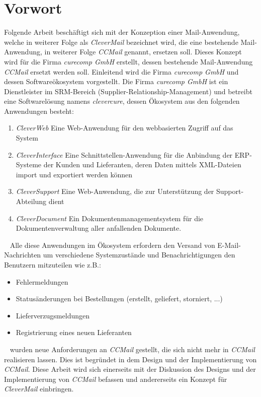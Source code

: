 \chapter{Vorwort} 	%
\label{cha:vorwort}
Folgende Arbeit beschäftigt sich mit der Konzeption einer Mail-Anwendung, welche in weiterer Folge als \emph{CleverMail} bezeichnet wird, die eine bestehende Mail-Anwendung, in weiterer Folge \emph{CCMail} genannt, ersetzen soll. Dieses Konzept wird für die Firma \emph{curecomp GmbH} erstellt, dessen bestehende Mail-Anwendung \emph{CCMail} ersetzt werden soll. Einleitend wird die Firma \emph{curecomp GmbH} und dessen Softwareökosystem vorgestellt. 
\newline
\newline
Die Firma \emph{curecomp GmbH} ist ein Dienstleister im SRM-Bereich (Supplier-Relationship-Management) und betreibt eine Softwarelösung namens \emph{clevercure}, dessen Ökosystem aus den folgenden Anwendungen besteht:
\newline
\begin{enumerate}
	\item\emph{CleverWeb}
	\newline
	Eine Web-Anwendung für den webbasierten Zugriff auf das System
	\item\emph{CleverInterface}
	\newline
	Eine Schnittstellen-Anwendung für die Anbindung der ERP-Systeme der Kunden und Lieferanten, deren Daten mittels XML-Dateien
	\newline
	import und exportiert werden können
	\item\emph{CleverSupport}
	\newline
	Eine Web-Anwendung, die zur Unterstützung der Support-Abteilung dient
	\item\emph{CleverDocument}
	\newline
	Ein Dokumentenmanagementsystem für die Dokumentenverwaltung aller anfallenden Dokumente.
\end{enumerate} 
\ \newline
Alle diese Anwendungen im Ökosystem erfordern den Versand von E-Mail-Nachrichten um verschiedene Systemzustände und Benachrichtigungen den Benutzern mitzuteilen wie z.B.:
\begin{itemize}
	\item Fehlermeldungen
	\item Statusänderungen bei Bestellungen (erstellt, geliefert, storniert, ...)
	\item Lieferverzugsmeldungen
	\item Registrierung eines neuen Lieferanten
\end{itemize}
\ \newpage
{} wurden neue Anforderungen an \emph{CCMail} gestellt, die sich nicht mehr in \emph{CCMail} realisieren lassen. Dies ist begründet in dem Design und der Implementierung von \emph{CCMail}. Diese Arbeit wird sich einerseits mit der Diskussion des Designs und der Implementierung von \emph{CCMail} befassen und andererseits ein Konzept für \emph{CleverMail} einbringen.
